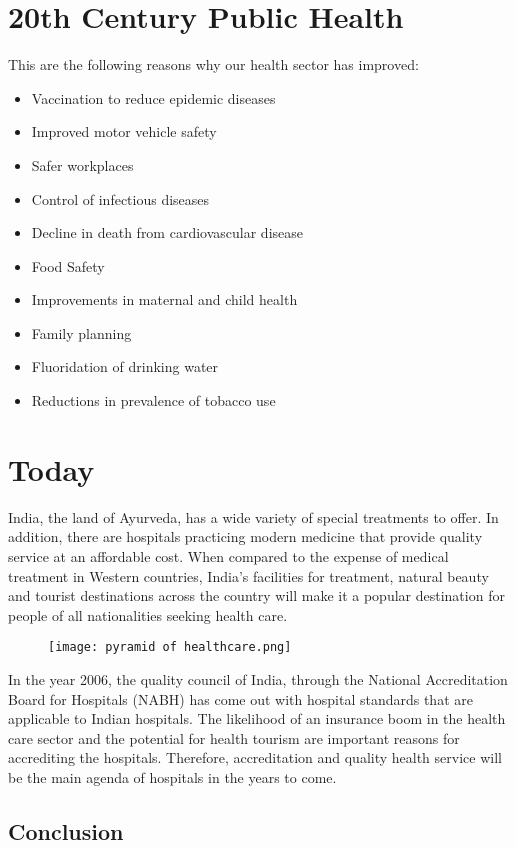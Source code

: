 \documentclass[11pt]{article}
\begin{document}
\section{\huge 20th Century Public Health}
This are the following reasons why our health sector has improved:
\begin{itemize}
\item \large Vaccination to reduce epidemic diseases
\item \large Improved motor vehicle safety
\item \large Safer workplaces
\item \large Control of infectious diseases
\item \large Decline in death from cardiovascular disease
\item \large Food Safety
\item \large Improvements in maternal and child health 
\item \large Family planning
\item \large Fluoridation of drinking water
\item \large  Reductions in prevalence of tobacco use
\end{itemize}
\clearpage
\section{Today}
\Large India, the land of Ayurveda, has a wide variety of special treatments to offer. In addition, there are hospitals practicing modern medicine that provide quality service at an affordable cost. When compared to the expense of medical treatment in Western countries, India’s facilities for treatment, natural beauty and tourist destinations across the country will make it a popular destination for people of all nationalities seeking health care.
\begin{figure}[h]
\texttt{[image: pyramid of healthcare.png]}
\end{figure}


In the year 2006, the quality council of India, through the National Accreditation Board for Hospitals (NABH) has come out with hospital standards that are applicable to Indian hospitals. The likelihood of an insurance boom in the health care sector and the potential for health tourism are important reasons for accrediting the hospitals. Therefore, accreditation and quality health service will be the main agenda of hospitals in the years to come.

\subsection{Conclusion}
\end{document}
